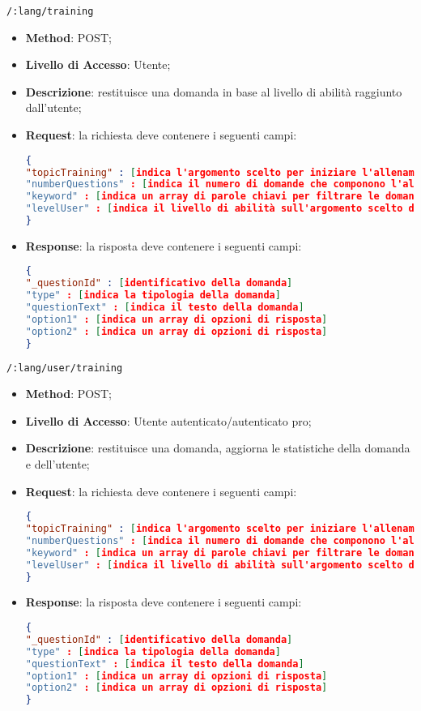 	\item \texttt{/:lang/training}
		\begin{itemize}
			\item \textbf{Method}: POST;
			\item \textbf{Livello di Accesso}: Utente;
			\item \textbf{Descrizione}: restituisce una domanda in base al livello di abilità raggiunto dall'utente;
			\item \textbf{Request}: la richiesta deve contenere i seguenti campi:
\begin{lstlisting}[language=json,firstnumber=1]
{
"topicTraining" : [indica l'argomento scelto per iniziare l'allenamento]
"numberQuestions" : [indica il numero di domande che componono l'allenamento]
"keyword" : [indica un array di parole chiavi per filtrare le domande]
"levelUser" : [indica il livello di abilità sull'argomento scelto dell'utente]
}
\end{lstlisting}
			\item \textbf{Response}: la risposta deve contenere i seguenti campi:
\begin{lstlisting}[language=json,firstnumber=1]
{
"_questionId" : [identificativo della domanda]
"type" : [indica la tipologia della domanda]
"questionText" : [indica il testo della domanda]
"option1" : [indica un array di opzioni di risposta]
"option2" : [indica un array di opzioni di risposta] 
}
\end{lstlisting}
		\end{itemize}
		
		
	\item \texttt{/:lang/user/training}
		\begin{itemize}
			\item \textbf{Method}: POST;
			\item \textbf{Livello di Accesso}: Utente autenticato/autenticato pro;
			\item \textbf{Descrizione}: restituisce una domanda, aggiorna le statistiche della domanda e dell'utente;
			\item \textbf{Request}: la richiesta deve contenere i seguenti campi:
\begin{lstlisting}[language=json,firstnumber=1]
{
"topicTraining" : [indica l'argomento scelto per iniziare l'allenamento]
"numberQuestions" : [indica il numero di domande che componono l'allenamento]
"keyword" : [indica un array di parole chiavi per filtrare le domande]
"levelUser" : [indica il livello di abilità sull'argomento scelto dell'utente]
}
\end{lstlisting}
		\item \textbf{Response}: la risposta deve contenere i seguenti campi:
\begin{lstlisting}[language=json,firstnumber=1]
{
"_questionId" : [identificativo della domanda]
"type" : [indica la tipologia della domanda]
"questionText" : [indica il testo della domanda]
"option1" : [indica un array di opzioni di risposta]
"option2" : [indica un array di opzioni di risposta] 
}
\end{lstlisting}
	\end{itemize}